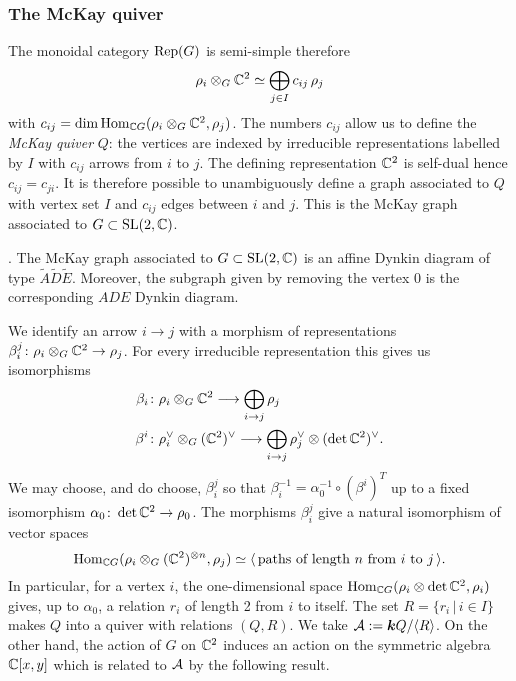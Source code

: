 \documentclass{amsart}
\theoremstyle{definition}
\begin{document}
\subsubsection{The McKay quiver}
The monoidal category $\operatorname{Rep}(G)$ is semi-simple therefore $$\rho_i \otimes_G \mathbb{C}^2 \simeq \bigoplus_{j \in I} c_{ij} \, \rho_j$$
with $c_{ij} =\dim \operatorname{Hom}_{\mathbb{C} G}(\rho_i \otimes_G \mathbb{C}^2, \rho_j)$.
The numbers $c_{ij}$ allow us to define the {\em McKay quiver} $Q$: the vertices are indexed by irreducible representations labelled by $I$ with $c_{ij}$  arrows from $i$ to $j$.
The defining representation $\mathbb{C}^2$ is self-dual hence $c_{ij} = c_{ji}$.
It is therefore possible to unambiguously define a graph associated to $Q$ with vertex set $I$ and $c_{ij}$ edges between $i$ and $j$.
This is the McKay graph associated to $G \subset \operatorname{SL}(2,\mathbb{C})$.

\begin{theorem}\cite{MR604577}.
The McKay graph associated to $G \subset \operatorname{SL}(2,\mathbb{C})$ is an affine Dynkin diagram of type $\widetilde{A}\widetilde{D}\widetilde{E}$.
Moreover, the subgraph given by removing the vertex $0$ is the corresponding $ADE$ Dynkin diagram.
\end{theorem}

We identify an arrow $i \rightarrow j$ with a morphism of representations $\beta_i^j \colon \rho_i \otimes_G \mathbb{C}^2 \rightarrow \rho_j$.
For every irreducible representation this gives us isomorphisms 
\begin{align}
    \beta_i &\colon \rho_i \otimes_G \mathbb{C}^2 \longrightarrow \bigoplus_{i \rightarrow j} \rho_j \\
    \beta^i &\colon \rho_i^\vee \otimes_G (\mathbb{C}^2)^\vee \longrightarrow \bigoplus_{i \rightarrow j} \rho_j^\vee \otimes (\operatorname{det} \mathbb{C}^2)^\vee.
\end{align}
We may choose, and do choose, $\beta_i^j$ so that $\beta_i^{-1} = \alpha_0^{-1} \circ (\beta^i)^T$ up to a fixed isomorphism $\alpha_0 \colon \operatorname{det} \mathbb{C}^2 \rightarrow \rho_0$.
The morphisms $\beta_i^j$ give a natural isomorphism of vector spaces $$\operatorname{Hom}_{\mathbb{C} G}(\rho_i \otimes_G (\mathbb{C}^2)^{\otimes n}, \rho_j) \simeq \langle\, \text{paths of length }n \text{ from }i \text{ to } j\,\rangle.$$
In particular, for a vertex $i$, the one-dimensional space $\operatorname{Hom}_{\mathbb{C} G} (\rho_i \otimes \operatorname{det} \mathbb{C}^2, \rho_i)$ gives, up to $\alpha_0$, a relation $r_i$ of length 2 from $i$ to itself.
The set $R = \{r_i \, |\, i \in I\}$ makes $Q$ into a quiver with relations $(Q, R)$. 
We take $\mathcal{A}:= {\boldsymbol{k}} Q/ \langle R\rangle$.
On the other hand, the action of $G$ on $\mathbb{C}^2$ induces an action on the symmetric algebra $\mathbb{C}[x,y]$ which is related to $\mathcal{A}$ by the following result.
\end{document}

